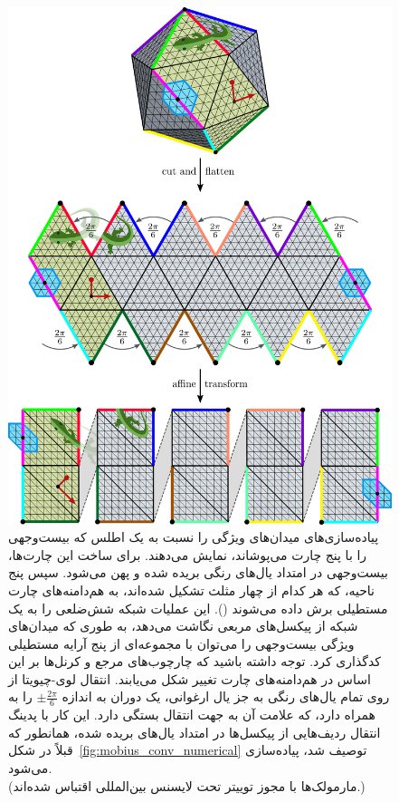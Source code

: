 \begin{figure}
    \centering
    \includegraphics[width=.9\textwidth]{figures/icosahedron_cutting.pdf}
    \vspace*{1.5ex}
    \caption{\small
        پیاده‌سازی‌های \cite{liu2018icoAltAz,gaugeIco2019,zhang2019orientation} میدان‌های ویژگی را نسبت به یک اطلس که بیست‌وجهی را با پنج چارت می‌پوشاند، نمایش می‌دهند.
        برای ساخت این چارت‌ها، بیست‌وجهی در امتداد یال‌های رنگی بریده شده و پهن می‌شود.
        سپس پنج ناحیه، که هر کدام از چهار مثلث تشکیل شده‌اند، به هم‌دامنه‌های چارت مستطیلی برش داده می‌شوند ().
        این عملیات شبکه شش‌ضلعی را به یک شبکه از پیکسل‌های مربعی نگاشت می‌دهد، به طوری که میدان‌های ویژگی بیست‌وجهی را می‌توان با مجموعه‌ای از پنج آرایه مستطیلی کدگذاری کرد.
        توجه داشته باشید که چارچوب‌های مرجع و کرنل‌ها بر این اساس در هم‌دامنه‌های چارت تغییر شکل می‌یابند.
        انتقال لوی-چیویتا از روی تمام یال‌های رنگی به جز یال ارغوانی، یک دوران به اندازه $\pm\frac{2\pi}{6}$ را به همراه دارد، که علامت آن به جهت انتقال بستگی دارد.
        این کار با پدینگ انتقال ردیف‌هایی از پیکسل‌ها در امتداد یال‌های بریده شده، همانطور که قبلاً در شکل~\ref{fig:mobius_conv_numerical} توصیف شد، پیاده‌سازی می‌شود.
        {
        \\ \color{gray} \scriptsize
            (مارمولک‌ها با مجوز توییتر تحت لایسنس بین‌المللی 
            \href{https://github.com/twitter/twemoji/blob/gh-pages/LICENSE-GRAPHICS}{\underline{}}
            اقتباس شده‌اند.)
        }
    }
    \label{fig:ico_cutting}
\end{figure}



